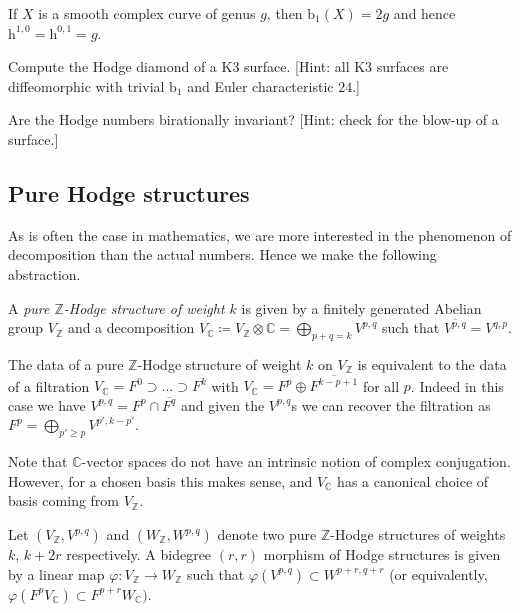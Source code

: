 \begin{example}
    If \(X\) is a smooth complex curve of genus \(g\), then
    \(\text{b}_1(X)=2g\) and hence \(\text{h}^{1,0}=\text{h}^{0,1}=g\).
\end{example}

\begin{exercise}
    Compute the Hodge diamond of a K3 surface. [Hint: all K3 surfaces are
    diffeomorphic with trivial \(\text{b}_1\) and Euler characteristic \(24\).]
\end{exercise}

\begin{exercise}
    Are the Hodge numbers birationally invariant? [Hint: check for the blow-up
    of a surface.]
\end{exercise}

\subsection{Pure Hodge structures} As is often the case in mathematics, we are
more interested in the phenomenon of decomposition than the actual numbers.
Hence we make the following abstraction.

\begin{definition}
    A \textit{pure \(\mathbb{Z}\)-Hodge structure of weight \(k\)} is given by a
    finitely generated Abelian group \(V_\mathbb{Z}\) and a decomposition
    \(V_\mathbb{C}\coloneq V_\mathbb{Z}\otimes \mathbb{C}=\bigoplus_{p+q=k}
    V^{p,q}\) such that \(\overline{V^{p,q}}=V^{q,p}\).
\end{definition}

The data of a pure \(\mathbb{Z}\)-Hodge structure of weight \(k\) on
\(V_\mathbb{Z}\) is equivalent to the data of a filtration
\(V_\mathbb{C}=F^0\supset ... \supset F^k\) with
\(V_\mathbb{C}=F^p\oplus \overline{F^{k-p+1}}\) for all \(p\). Indeed in this
case we have \(V^{p,q}=F^p\cap \overline{F^q}\) and given the \(V^{p,q}\)s we
can recover the filtration as \(F^p=\bigoplus_{p'\geq p}V^{p',k-p'}\).

\begin{remark}
    Note that \(\mathbb{C}\)-vector spaces do not have an intrinsic notion of
    complex conjugation. However, for a chosen basis this makes sense, and
    \(V_\mathbb{C}\) has a canonical choice of basis coming from
    \(V_\mathbb{Z}\).
\end{remark}

\begin{definition}
Let \((V_\mathbb{Z},V^{p,q})\) and \((W_\mathbb{Z},W^{p,q})\) denote two pure
\(\mathbb{Z}\)-Hodge structures of weights \(k\), \(k+2r\) respectively. A
bidegree \((r,r)\) morphism of Hodge structures is given by a linear map
\(\varphi:V_\mathbb{Z}\to W_\mathbb{Z}\) such that \(\varphi(V^{p,q})\subset
W^{p+r,q+r}\) (or equivalently, \(\varphi (F^pV_\mathbb{C})\subset
F^{p+r}W_\mathbb{C})\).
\end{definition}

